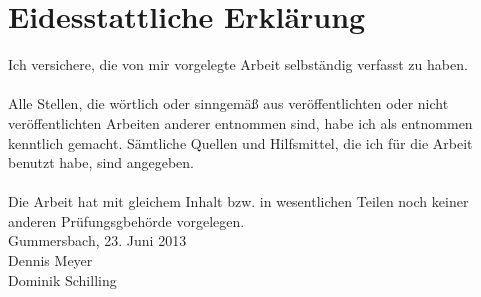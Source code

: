 
\chapter*{Eidesstattliche Erklärung}
Ich versichere, die von mir vorgelegte Arbeit selbständig verfasst zu haben.\\ \\
Alle Stellen, die wörtlich oder sinngemäß aus veröffentlichten oder nicht veröffentlichten Arbeiten anderer entnommen sind, habe ich als entnommen kenntlich gemacht. Sämtliche Quellen und Hilfsmittel, die ich für die Arbeit benutzt habe, sind angegeben.\\ \\
Die Arbeit hat mit gleichem Inhalt bzw. in wesentlichen Teilen noch keiner anderen Prüfungsgbehörde vorgelegen.
\vspace{1.5cm}
\\
Gummersbach, 23. Juni 2013
\vspace{3cm}
\\
Dennis Meyer \\
Dominik Schilling
